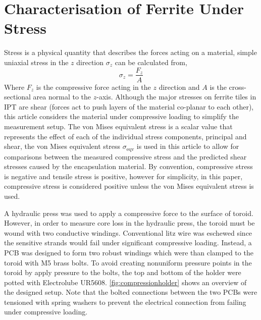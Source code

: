 \documentclass[conference]{IEEEtran}
\begin{document}
\section{Characterisation of Ferrite Under Stress}
Stress is a physical quantity that describes the forces acting on a material, simple uniaxial stress in the $z$ direction $\sigma_z$ can be calculated from, 
\begin{equation}
  \sigma_z = \frac{F_z}{A}
\end{equation}
Where $F_z$ is the compressive force acting in the $z$ direction and $A$ is the cross-sectional area normal to the $z$-axis. 
Although the major stresses on ferrite tiles in IPT are shear (forces act to push layers of the material co-planar to each other), this article considers the material under compressive loading to simplify the measurement setup. 
The von Mises equivalent stress is a scalar value that represents the effect of each of the individual stress components, principal and shear, the von Mises equivalent stress $\sigma_\text{eqv}$ is used in this article to allow for comparisons between the measured compressive stress and the predicted shear stresses caused by the encapsulation material. 
By convention, compressive stress is negative and tensile stress is positive, however for simplicity, in this paper, compressive stress is considered positive unless the von Mises equivalent stress is used. 

A hydraulic press was used to apply a compressive force to the surface of toroid. 
However, in order to measure core loss in the hydraulic press, the toroid must be wound with two conductive windings. 
Conventional litz wire was eschewed since the sensitive strands would fail under significant compressive loading. 
Instead, a PCB was designed to form two robust windings which were than clamped to the toroid with M5 brass bolts. 
To avoid creating nonuniform pressure points in the toroid by apply pressure to the bolts, the top and bottom of the holder were potted with Electrolube UR5608. 
\cref{fig:compressionholder} shows an overview of the designed setup. 
Note that the bolted connections between the two PCBs were tensioned with spring washers to prevent the electrical connection from failing under compressive loading. 
\end{document}
